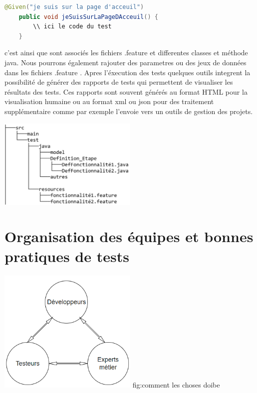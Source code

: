 \begin{lstlisting}[language=Java]
    @Given("je suis sur la page d'acceuil")
    public void jeSuisSurLaPageDAcceuil() {
        \\ ici le code du test
    }
\end{lstlisting}
c'est ainsi que sont associés les fichiers .feature et differentes classes et méthode java.
Nous pourrons également rajouter des parametres ou des jeux de données dans les fichiers .feature \parencite{BddInAction}.
Apres l'éxecution des tests quelques outils integrent la possibilité de générer des rapports de tests qui permettent de visualiser les résultats des tests. Ces rapports sont souvent générés au format HTML pour la visualisation humaine ou au format xml ou json pour des traitement supplémentaire comme par exemple l'envoie vers un outils de gestion des projets.

\begin{center}
    \includegraphics[width=0.5\textwidth]{filetree.png}

\end{center}


\section{Organisation des équipes et bonnes pratiques de tests }
\label{sec:organisation}

\begin{center}
    \includegraphics[width=0.5\textwidth]{interaction.png}
    \linebreak
fig:comment les choses doibe
\end{center}

